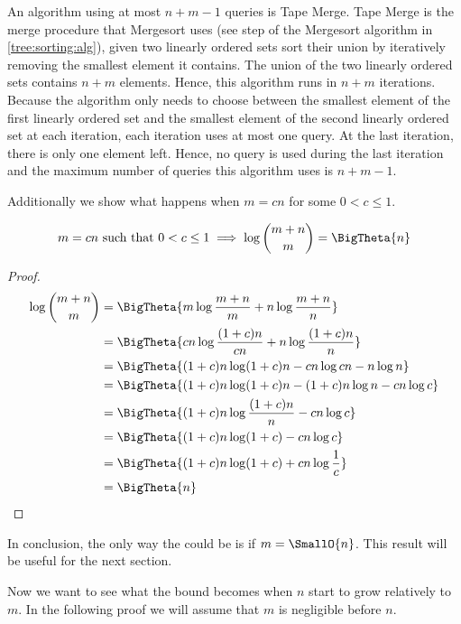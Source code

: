 An algorithm using at most \(n+m-1\) queries is Tape Merge. Tape Merge is the
merge procedure that Mergesort uses (see step  of the Mergesort
algorithm in \ref{tree:sorting:alg}), \ie given two linearly ordered sets sort
their union by iteratively removing the smallest element it contains. The union
of the two linearly ordered sets contains \(n+m\) elements. Hence, this
algorithm runs in \(n+m\) iterations. Because the algorithm only needs to
choose between the smallest element of the first linearly ordered set and the
smallest element of the second linearly ordered set at each iteration, each
iteration uses at most one query. At the last iteration, there is only one
element left. Hence, no query is used during the last iteration and the maximum
number of queries this algorithm uses is \(n+m-1\).

Additionally we show what happens when \(m = c n\) for some \(0 < c \le 1\).

\begin{lemma}
\begin{align*}
m = c n \text{ such that } 0 < c \le 1 &\implies \log\binom{m+n}{m} = \BigTheta{n}\\
\end{align*}
\end{lemma}

\begin{proof}
\begin{align*}
\log\binom{m+n}{m} &= \BigTheta{m \log\frac{m+n}{m} + n \log\frac{m+n}{n}}\\
&= \BigTheta{cn \log\frac{(1+c)n}{cn} + n \log\frac{(1+c)n}{n}}\\
&= \BigTheta{(1+c)n \log (1+c)n - cn \log cn - n \log n}\\
&= \BigTheta{(1+c)n \log (1+c)n - (1+c)n \log n - cn \log c}\\
&= \BigTheta{(1+c)n \log \frac{(1+c)n}{n} - cn \log c}\\
&= \BigTheta{(1+c)n \log (1+c) - cn \log c}\\
&= \BigTheta{(1+c)n \log (1+c) + cn \log \frac{1}{c}}\\
&= \BigTheta{n}\\
\end{align*}
\end{proof}

In conclusion, the only way the  could be  is if \(m =
\SmallO{n}\). This result will be useful for the next section.

Now we want to see what the bound becomes when $n$ start to grow relatively to
$m$. In the following proof we will assume that $m$ is negligible before $n$.

